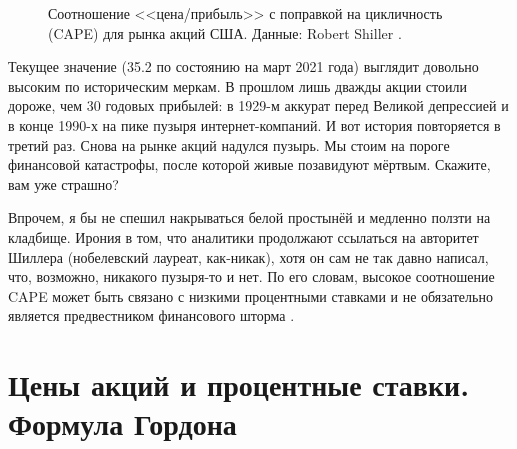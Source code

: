 \begin{figure}[ht]
\centering
{}
\caption{Соотношение <<цена/прибыль>> с поправкой на цикличность (CAPE) для 
рынка акций США. Данные: Robert Shiller \cite{shillerOnline}.}
\label{shiller_pe_historical_chart}
\end{figure}

Текущее значение (35.2 по состоянию на март 2021 года) выглядит довольно 
высоким по историческим меркам. В прошлом лишь дважды акции стоили дороже, чем 
30 годовых прибылей: в 1929-м аккурат перед Великой депрессией и в конце 1990-х 
на пике пузыря интернет-компаний. И вот история повторяется в третий раз. Снова 
на рынке акций надулся пузырь. Мы стоим на пороге финансовой катастрофы, после 
которой живые позавидуют мёртвым. Скажите, вам уже страшно?

Впрочем, я бы не спешил накрываться белой простынёй и медленно ползти на 
кладбище. Ирония в том, что аналитики продолжают ссылаться на авторитет Шиллера 
(нобелевский лауреат, как-никак), хотя он сам не так давно написал, что, 
возможно, никакого пузыря-то и нет. По его словам, высокое соотношение CAPE 
может быть связано с низкими процентными ставками и не обязательно является 
предвестником финансового шторма \cite{shiller2020cape}.

\section*{Цены акций и процентные ставки. Формула Гордона}

